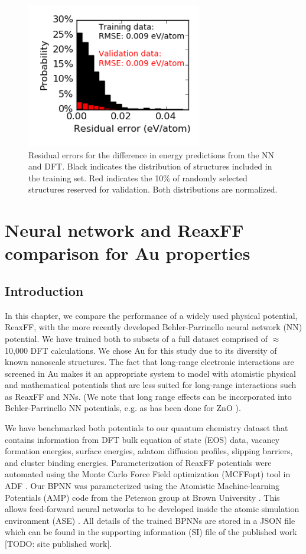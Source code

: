\documentclass[12pt]{cmuthesis}
\begin{document}
\begin{figure}[h]
\centering
\includegraphics[width=3in]{./images/distribution.png}
\caption{\label{fig-distribution}
Residual errors for the  difference in energy predictions from the NN and DFT. Black indicates the distribution of structures included in the training set. Red indicates the 10\% of randomly selected structures reserved for validation. Both distributions are normalized.}
\end{figure}

\chapter{Neural network and ReaxFF comparison for Au properties}
\label{sec:ch4}
\section{Introduction}
\label{sec:org9386861}
In this chapter, we compare the performance of a widely used physical potential, ReaxFF, with the more recently developed Behler-Parrinello neural network (NN) potential. We have trained both to subsets of a full dataset comprised of \(\approx\) 10,000 DFT calculations. We chose Au for this study due to its diversity of known nanoscale structures. The fact that long-range electronic interactions are screened in Au makes it an appropriate system to model with atomistic physical and mathematical potentials that are less suited for long-range interactions such as ReaxFF and NNs. (We note that long range effects can be incorporated into Behler-Parrinello NN potentials, e.g. as has been done for ZnO \cite{artrith-2011-high}).

We have benchmarked both potentials to our quantum chemistry dataset that contains information from DFT bulk equation of state (EOS) data, vacancy formation energies, surface energies, adatom diffusion profiles, slipping barriers, and cluster binding energies. Parameterization of ReaxFF potentials were automated using the Monte Carlo Force Field optimization (MCFFopt) tool in ADF \cite{velde-2001-chemis-adf,iype-2013-param-monte}. Our BPNN was parameterized using the Atomistic Machine-learning Potentials (AMP) code from the Peterson group at Brown University  \cite{khorshidi-2016-amp}. This allows feed-forward neural networks to be developed inside the atomic simulation environment (ASE) \cite{bahn-2002-objec-orien}. All details of the trained BPNNs are stored in a JSON file which can be found in the supporting information (SI) file of the published work [TODO: site published work].
\end{document}
